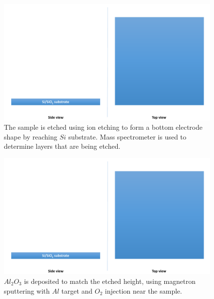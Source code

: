 \begin{multicols}{2}[]
    
    \begin{figure}[H]
        \centering
        \includegraphics[width=0.375\paperwidth, page=7]{img/04/Manufacturing_under.pdf}
        \caption{The sample is etched using ion etching to form a bottom electrode shape by reaching $Si$ substrate. Mass spectrometer is used to determine layers that are being etched.}
        \label{FabricationBottomEtching}
    \end{figure}
    
    \begin{figure}[H]
        \centering
        \includegraphics[width=0.375\paperwidth, page=8]{img/04/Manufacturing_under.pdf}
        \caption{$Al_2O_3$ is deposited to match the etched height, using magnetron sputtering with $Al$ target and $O_2$ injection near the sample.}
        \label{FabricationBottomOxide}
    \end{figure}
    
\end{multicols}

